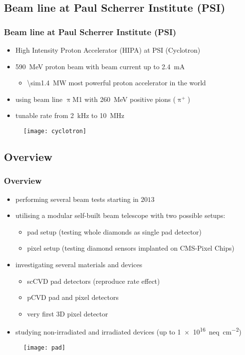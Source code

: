 \subsection{Beam line at Paul Scherrer Institute (PSI)}
\begin{frame}
	\frametitle{Beam line at Paul Scherrer Institute (PSI)}
	\begin{itemize}
		\setlength{\itemsep}{\fill}
		\item High Intensity Proton Accelerator (HIPA) at PSI (Cyclotron)
		\item \SI{590}{\mega\electronvolt} proton beam with beam current up to \SI{2.4}{\milli\ampere}
		\begin{itemize}
			\vspace*{4pt}
			\item \SI{\sim1.4}{\mega\watt} \ra most powerful proton accelerator in the world
		\end{itemize}
		\item using beam line $\uppi$M1 with \SI{260}{\mega\electronvolt} positive pions ($\uppi^+$)
		\item tunable rate from \SI{2}{\kilo\hertz} to \SI{10}{\mega\hertz}
	\end{itemize}
	\begin{figure}
		\centering
		\texttt{[image: cyclotron]}
	\end{figure}
\end{frame}
\subsection{Overview}
\begin{frame}
	\frametitle{Overview}
	\begin{itemize}
		\item performing several beam tests starting in $2013$
		\item utilising a modular self-built beam telescope with two possible setups:
			\begin{itemize}
				\item pad setup (testing whole diamonds as single pad detector)
				\item pixel setup (testing diamond sensors implanted on CMS-Pixel Chips)
			\end{itemize}
		\item investigating several materials and devices
		\begin{itemize}
			\item scCVD pad detectors (reproduce rate effect)
			\item pCVD pad and pixel detectors
			\item very first 3D pixel detector
		\end{itemize}
		\item studying non-irradiated and irradiated devices (up to \SI{1e16}{neq\per cm^2})
	\end{itemize}
	\begin{figure}
		\centering
		\texttt{[image: pad]}
	\end{figure}
\end{frame}
